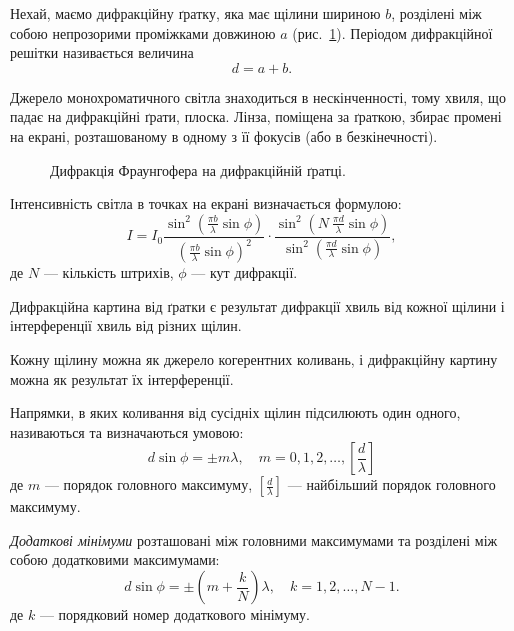 Нехай, маємо дифракційну ґратку, яка має щілини шириною $b$, розділені між собою непрозорими проміжками довжиною $a$ (рис.~\ref{pic:slots}). Періодом дифракційної решітки називається величина
\begin{equation*}
    d = a + b.
\end{equation*}


Джерело монохроматичного світла знаходиться в нескінченності, тому хвиля, що падає на дифракційні ґрати, плоска. Лінза, поміщена за ґраткою, збирає промені на екрані, розташованому в одному з її фокусів (або в безкінечності).

\begin{figure}[hb!]\centering
    
    \caption{Дифракція Фраунгофера на дифракційній ґратці.}
    \label{pic:slots}
\end{figure}


Інтенсивність світла в точках на екрані визначається формулою:
\begin{equation}\label{eq:Difraction_I_slots}
    I = I_0 \frac{\sin^2\left( {\frac{\pi b}{\lambda} \sin\phi}\right)}{\left( \frac{\pi b}{\lambda} \sin\phi\right)^2} \cdot
    \frac{\sin^2\left( {N\ \frac{\pi d}{\lambda} \sin\phi}\right)}{\sin^2\left( \frac{\pi d}{\lambda} \sin\phi\right)},
\end{equation}
де $N$ --- кількість штрихів, $\phi$ --- кут дифракції.

Дифракційна картина від ґратки є результат дифракції хвиль від кожної щілини і інтерференції хвиль від різних щілин.

Кожну щілину можна як джерело когерентних коливань, і дифракційну картину можна як результат їх інтерференції.

Напрямки, в яких коливання від сусідніх щілин підсилюють один одного, називаються  та визначаються умовою:
\begin{equation}\label{eq:Difraction_main_max}
    d\sin\phi=\pm m\lambda, \quad m = 0, 1, 2, \ldots, \left[\frac{d}{\lambda}\right]
\end{equation}
де $m$ --- порядок головного максимуму,  $\left[\frac{d}{\lambda}\right]$ --- найбільший порядок головного максимуму.

\emph{Додаткові мінімуми} розташовані між головними максимумами та розділені між собою додатковими максимумами:
\begin{equation}\label{eq:Difraction_add_min}
    d\sin\phi=\pm\left(m + \frac{k}{N}\right) \lambda, \quad k = 1, 2, \ldots, N - 1.
\end{equation}
де $k$ --- порядковий номер додаткового мінімуму.

